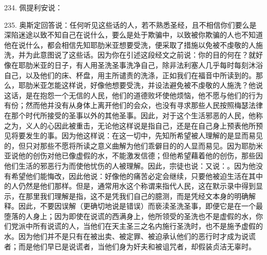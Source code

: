 234. 佩提利安说：\par

235. 奥斯定回答说：任何听见这些话的人，若不熟悉圣经，且不相信你们要么是深陷迷途以致不知自己在说什么，要么是处于欺骗中，以致被你欺骗的人也不知道他在说什么，都会相信先知耶肋米亚想要受洗，便采取了措施以免被不虔敬的人施洗，并为此意图说了这些话。因为你在引述这段经文之前说：你的目的何在？就好像在耶肋米亚的日子，有人用圣洗圣事洗净自己，除非法利塞人几乎每时每刻沐浴自己，以及他们的床、杯盘，用主所谴责的洗涤，正如我们在福音中所读到的。那么，耶肋米亚怎能这样说，好像他想要受洗，并设法避免被不虔敬的人施洗？他说这话，是在抱怨一个无信的人民，他们的道德败坏使他烦恼，他不愿与他们的行为有份；然而他并没有从身体上离开他们的会众，也没有寻求那些人民按照梅瑟法律在那个时代所接受的圣事以外的其他圣事。因此，对于这个生活邪恶的人民，他称之为，义人的心因此被重击，无论他这样说是指自己，还是在自己身上预表他所预见将要发生的事。因为他这样说：在这一切中，先知所希望被人理解的是显而易见的，但只对那些不愿将所读之意义曲解为他们乖僻目的的人显而易见。因为耶肋米亚说他的创伤对他已像虚假的水，不能激发信德；但他希望藉着他的创伤，那些因他们生活的邪恶行为而使他忧伤的人被理解。因此，宗徒也说：又说：。因为他没有希望他们能悔改，因此他说：好像他的痛苦必定会继续，只要他被迫生活在其中的人仍然是他们那样。但是，通常用水这个称谓来指代人民，这在默示录中得到显示，在那里我们理解是指，这不是凭我们自己的臆测，而是凭经文本身的明确解释。因此，不要因误解（更确切地说是错误）而亵渎圣洗圣事，即便它是在一个最堕落的人身上；因为即使在说谎的西满身上，他所领受的圣洗也不是虚假的水，你们党派中所有说谎的人，当他们在天主圣三之名内施行圣洗时，也不是施予虚假的水。因为他们并不是只有在被出卖、被定罪、被迫承认他们的恶行时才成为说谎者；而是他们早已是说谎者，当他们身为奸夫和被诅咒者，却假装贞洁无辜时。\par

